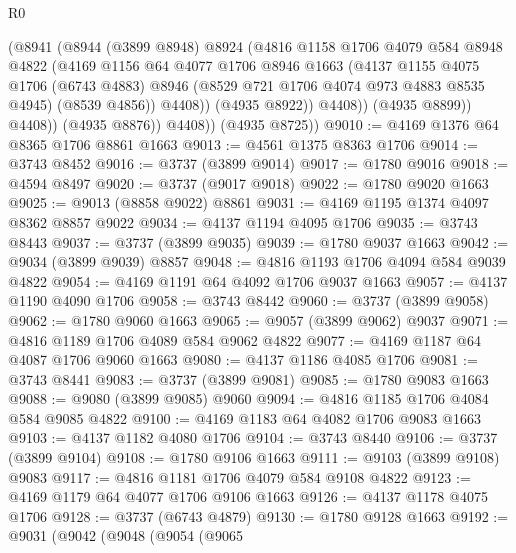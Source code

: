 \begin{lexlean}{R0}
\begin{coremodule}
                    (@8941
                      (@8944
                        (@3899 @8948)
                        @8924
                        (@4816
                          @1158
                          @1706
                          @4079
                          @584
                          @8948
                          @4822
                          (@4169
                            @1156
                            @64
                            @4077
                            @1706
                            @8946
                            @1663
                            (@4137
                              @1155
                              @4075
                              @1706
                              (@6743 @4883)
                              @8946
                              (@8529 @721 @1706 @4074 @973 @4883 @8535 @4945)
                              (@8539 @4856))
                            @4408))
                        (@4935 @8922))
                      @4408))
                  (@4935 @8899))
                @4408))
            (@4935 @8876))
          @4408))
      (@4935 @8725))
@9010 := @4169 @1376 @64 @8365 @1706 @8861 @1663
@9013 := @4561 @1375 @8363 @1706
@9014 := @3743 @8452
@9016 := @3737 (@3899 @9014)
@9017 := @1780 @9016
@9018 := @4594 @8497
@9020 := @3737 (@9017 @9018)
@9022 := @1780 @9020 @1663
@9025 := @9013 (@8858 @9022) @8861
@9031 := @4169 @1195 @1374 @4097 @8362 @8857 @9022
@9034 := @4137 @1194 @4095 @1706
@9035 := @3743 @8443
@9037 := @3737 (@3899 @9035)
@9039 := @1780 @9037 @1663
@9042 := @9034 (@3899 @9039) @8857
@9048 := @4816 @1193 @1706 @4094 @584 @9039 @4822
@9054 := @4169 @1191 @64 @4092 @1706 @9037 @1663
@9057 := @4137 @1190 @4090 @1706
@9058 := @3743 @8442
@9060 := @3737 (@3899 @9058)
@9062 := @1780 @9060 @1663
@9065 := @9057 (@3899 @9062) @9037
@9071 := @4816 @1189 @1706 @4089 @584 @9062 @4822
@9077 := @4169 @1187 @64 @4087 @1706 @9060 @1663
@9080 := @4137 @1186 @4085 @1706
@9081 := @3743 @8441
@9083 := @3737 (@3899 @9081)
@9085 := @1780 @9083 @1663
@9088 := @9080 (@3899 @9085) @9060
@9094 := @4816 @1185 @1706 @4084 @584 @9085 @4822
@9100 := @4169 @1183 @64 @4082 @1706 @9083 @1663
@9103 := @4137 @1182 @4080 @1706
@9104 := @3743 @8440
@9106 := @3737 (@3899 @9104)
@9108 := @1780 @9106 @1663
@9111 := @9103 (@3899 @9108) @9083
@9117 := @4816 @1181 @1706 @4079 @584 @9108 @4822
@9123 := @4169 @1179 @64 @4077 @1706 @9106 @1663
@9126 := @4137 @1178 @4075 @1706
@9128 := @3737 (@6743 @4879)
@9130 := @1780 @9128 @1663
@9192 := @9031
    (@9042
      (@9048
        (@9054
          (@9065

\end{coremodule}
\end{lexlean}
